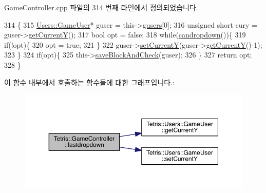 Game\+Controller.\+cpp 파일의 314 번째 라인에서 정의되었습니다.


\begin{DoxyCode}
314                                      \{
315                 \hyperlink{class_tetris_1_1_users_1_1_game_user}{Users::GameUser}* guser = this->\hyperlink{class_tetris_1_1_game_controller_a1a31d3a933daad6d95e20458eea2900e}{gusers}[0];
316                 \textcolor{keywordtype}{unsigned} \textcolor{keywordtype}{short} cury = guser->\hyperlink{class_tetris_1_1_users_1_1_game_user_af5bd7ff0b575af1b42b093488cff97e2}{getCurrentY}();
317                 \textcolor{keywordtype}{bool} opt = \textcolor{keyword}{false};
318                 \textcolor{keywordflow}{while}(\hyperlink{class_tetris_1_1_game_controller_ac4993d5ad8640ac617fec341fdb301ee}{candropdown}())\{
319                     \textcolor{keywordflow}{if}(!opt)\{
320                         opt = \textcolor{keyword}{true};
321                     \}
322                     guser->\hyperlink{class_tetris_1_1_users_1_1_game_user_aeedbe521004c22018b73a509e99f7d81}{setCurrentY}(guser->\hyperlink{class_tetris_1_1_users_1_1_game_user_af5bd7ff0b575af1b42b093488cff97e2}{getCurrentY}()-1);
323                 \}
324                 \textcolor{keywordflow}{if}(opt)\{
325                     this->\hyperlink{class_tetris_1_1_game_controller_a3c63a9754e4cbeae4f66a5760bb4055d}{saveBlockAndCheck}(guser);
326                 \}
327                 \textcolor{keywordflow}{return} opt;
328             \}
\end{DoxyCode}
이 함수 내부에서 호출하는 함수들에 대한 그래프입니다.\+:
\nopagebreak
\begin{figure}[H]
\begin{center}
\leavevmode
\includegraphics[width=350pt]{db/dd2/class_tetris_1_1_game_controller_a8d5b65ec7638519a39b4ba8a71e67fff_cgraph}
\end{center}
\end{figure}
\mbox{\label{class_tetris_1_1_game_controller_a8d5b65ec7638519a39b4ba8a71e67fff}} 
